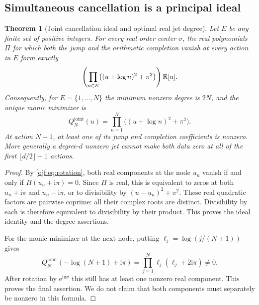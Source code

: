 \documentclass[11pt,a4paper]{article}
\numberwithin{equation}{section}
\newtheorem{theorem}{Theorem}[section]
\theoremstyle{definition}\newtheorem{definition}[theorem]{Definition}
\theoremstyle{remark}\newtheorem{remark}[theorem]{Remark}
\newcommand{\ee}{\mathrm e}\newcommand{\ii}{\mathrm i}\newcommand{\dd}{\,\mathrm d}
\begin{document}
\subsection{Simultaneous cancellation is a principal ideal}

\begin{theorem}[Joint cancellation ideal and optimal real jet degree]
\label{ojf:thm:joint}
Let $E$ be any finite set of positive integers. For every real order
center $\sigma$, the real polynomials $\Pi$ for which both the jump and
the arithmetic completion vanish at every action in $E$ form exactly
\begin{equation}\label{ojf:eq:joint-ideal}
 \left(\prod_{n\in E}\bigl((u+\log n)^2+\pi^2\bigr)\right)\mathbb R[u].
\end{equation}
Consequently, for $E=\{1,\ldots,N\}$ the minimum nonzero degree is $2N$,
and the unique monic minimizer is
\begin{equation}\label{ojf:eq:joint-extremizer}
 Q_N^{\mathrm{joint}}(u)=
       \prod_{n=1}^N\bigl((u+\log n)^2+\pi^2\bigr).
\end{equation}
At action $N+1$, at least one of its jump and completion coefficients
is nonzero. More generally a degree-$d$ nonzero jet cannot make both
data zero at all of the first $\lfloor d/2\rfloor+1$ actions.
\end{theorem}

\begin{proof}
By \eqref{ojf:eq:rotation}, both real components at the node $u_n$
vanish if and only if $\Pi(u_n+\ii\pi)=0$. Since $\Pi$ is real,
this is equivalent to zeros at both $u_n+\ii\pi$ and $u_n-\ii\pi$,
or to divisibility by $(u-u_n)^2+\pi^2$. These real quadratic factors
are pairwise coprime: all their complex roots are distinct. Divisibility
by each is therefore equivalent to divisibility by their product.
This proves the ideal identity and the degree assertions.

For the monic minimizer at the next node, putting
$\ell_j=\log(j/(N+1))$ gives
\begin{equation}\label{ojf:eq:next-joint}
 Q_N^{\mathrm{joint}}(-\log(N+1)+\ii\pi)
      =\prod_{j=1}^N\ell_j(\ell_j+2\ii\pi)\ne0.
\end{equation}
After rotation by $\ee^{\ii\pi\sigma}$ this still has at least one
nonzero real component. This proves the final assertion. We do not
claim that both components must separately be nonzero in this formula.
\end{proof}
\end{document}
